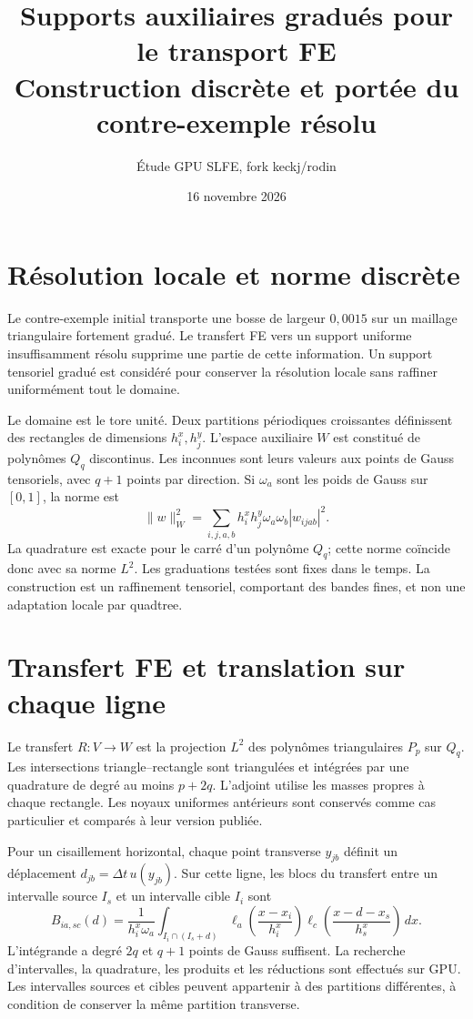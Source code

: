 \documentclass[11pt,a4paper]{article}
\title{Supports auxiliaires gradués pour le transport FE\\
Construction discrète et portée du contre-exemple résolu}
\author{Étude GPU SLFE, fork keckj/rodin}
\date{16 novembre 2026}
\begin{document}
\maketitle

\section{Résolution locale et norme discrète}
Le contre-exemple initial transporte une bosse de largeur $0{,}0015$ sur
un maillage triangulaire fortement gradué. Le transfert FE vers un support
uniforme insuffisamment résolu supprime une partie de cette information.
Un support tensoriel gradué est considéré pour conserver la résolution
locale sans raffiner uniformément tout le domaine.

Le domaine est le tore unité. Deux partitions périodiques croissantes
définissent des rectangles de dimensions $h_i^x,h_j^y$. L'espace auxiliaire
$W$ est constitué de polynômes $Q_q$ discontinus. Les inconnues sont leurs
valeurs aux points de Gauss tensoriels, avec $q+1$ points par direction.
Si $\omega_a$ sont les poids de Gauss sur $[0,1]$, la norme est
\[
 \|w\|_W^2=\sum_{i,j,a,b} h_i^x h_j^y\omega_a\omega_b
                         |w_{ijab}|^2.
\]
La quadrature est exacte pour le carré d'un polynôme $Q_q$; cette norme
coïncide donc avec sa norme $L^2$. Les graduations testées sont fixes dans
le temps. La construction est un raffinement tensoriel, comportant des
bandes fines, et non une adaptation locale par quadtree.

\section{Transfert FE et translation sur chaque ligne}
Le transfert $R:V\to W$ est la projection $L^2$ des polynômes triangulaires
$P_p$ sur $Q_q$. Les intersections triangle--rectangle sont triangulées
et intégrées par une quadrature de degré au moins $p+2q$.
L'adjoint utilise les masses propres à chaque rectangle. Les noyaux
uniformes antérieurs sont conservés comme cas particulier et comparés
à leur version publiée.

Pour un cisaillement horizontal, chaque point transverse $y_{jb}$ définit
un déplacement $d_{jb}=\Delta t\,u(y_{jb})$. Sur cette ligne, les blocs du
transfert entre un intervalle source $I_s$ et un intervalle cible $I_i$ sont
\[
 B_{ia,sc}(d)=\frac{1}{h_i^x\omega_a}
 \int_{I_i\cap(I_s+d)}
 \ell_a\!\left(\frac{x-x_i}{h_i^x}\right)
 \ell_c\!\left(\frac{x-d-x_s}{h_s^x}\right)\,dx.
\]
L'intégrande a degré $2q$ et $q+1$ points de Gauss suffisent. La recherche
d'intervalles, la quadrature, les produits et les réductions sont effectués
sur GPU. Les intervalles sources et cibles peuvent appartenir à des
partitions différentes, à condition de conserver la même partition transverse.
\end{document}
